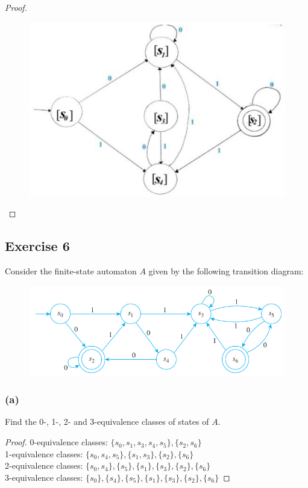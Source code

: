 \documentclass[14pt]{extarticle}
\begin{document}
\begin{proof}
    \begin{figure}[ht!]
        \centering
        \includegraphics[scale=0.3]{../images/12.3.5.b.png}
    \end{figure}
\end{proof}

\subsection{Exercise 6}
Consider the finite-state automaton \(A\) given by the following transition diagram:

\begin{figure}[ht!]
    \centering
    \includegraphics[scale=0.5]{../images/12.3.6.png}
\end{figure}

\subsubsection{(a)}
Find the 0-, 1-, 2- and 3-equivalence classes of states of \(A\).

\begin{proof}
    0-equivalence classes: \(\{s_0, s_1, s_3, s_4, s_5\}, \{s_2, s_6\}\) \\
    1-equivalence classes: \(\{s_0, s_4, s_5\}, \{s_1, s_3\}, \{s_2\}, \{s_6\}\) \\
    2-equivalence classes: \(\{s_0, s_4\}, \{s_5\}, \{s_1\}, \{s_3\}, \{s_2\}, \{s_6\}\) \\
    3-equivalence classes: \(\{s_0\}, \{s_4\}, \{s_5\}, \{s_1\}, \{s_3\}, \{s_2\}, \{s_6\}\)
\end{proof}
\end{document}
